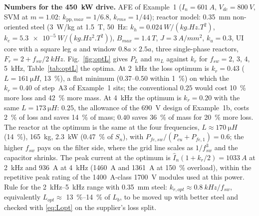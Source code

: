 \documentclass[10pt,a4paper]{scrartcl}
\newcommand{\Vdc}{V_{dc}}
\newcommand{\fsw}{f_{sw}}
\newcommand{\pp}{\mathrm{pp}}
\begin{document}
\begin{onehalfspace}
\textbf{Numbers for the \SI{450}{kW} drive.} AFE of Example~1 ($I_n = \SI{601}{A}$, $\Vdc = \SI{800}{V}$, SVM at $m = 1.02$: $k_{\pp,max} = 1/6.8$, $k_{rms} = 1/44$); reactor model: \SI{0.35}{mm} non-oriented steel (\SI{3}{W/kg} at \SI{1.5}{T}, \SI{50}{Hz}: $k_h = \SI{0.024}{W/(kg.Hz.T^2)}$, $k_e = \SI{5.3e-5}{W/(kg.Hz^2.T^2)}$), $B_{max} = \SI{1.4}{T}$, $J = \SI{3}{A/mm^2}$, $k_u = 0.3$, UI core with a square leg $a$ and window $0.8a \times 2.5a$, three single-phase reactors, $F_r = 2 + \fsw/\SI{2}{kHz}$. Fig.~\ref{fig:optL} gives $P_L$ and $m_L$ against $k_r$ for $\fsw = 2$, $3$, $4$, \SI{5}{kHz}, Table~\ref{tab:optL} the optima. At \SI{2}{kHz} the loss optimum is $k_r = 0.43$ ($L = \SI{161}{\micro H}$, \SI{13}{\percent}), a flat minimum ($0.37$--$0.50$ within \SI{1}{\percent}) on which the $k_r = 0.40$ of step~A3 of Example~1 sits; the conventional $0.25$ would cost \SI{10}{\percent} more loss and \SI{42}{\percent} more mass. At \SI{4}{kHz} the optimum is $k_r = 0.20$ with the same $L = \SI{173}{\micro H}$: $0.25$, the allowance of the \SI{690}{V} design of Example~1b, costs \SI{2}{\percent} of loss and saves \SI{14}{\percent} of mass; $0.40$ saves \SI{36}{\percent} of mass for \SI{20}{\percent} more loss. The reactor at the optimum is the same at the four frequencies, $L \approx \SI{170}{\micro H}$ (\SI{14}{\percent}), \SI{165}{kg}, \SI{2.3}{kW} (\SI{0.47}{\percent} of $S_n$), with $P_{fe,sw}/(P_{cu} + P_{fe,1}) = 0.6$; the higher $\fsw$ pays on the filter side, where the grid line scales as $1/\fsw^3$ and the capacitor shrinks. The peak current at the optimum is $\hat I_n(1 + k_r/2) = \SI{1033}{A}$ at \SI{2}{kHz} and \SI{936}{A} at \SI{4}{kHz} (\SI{1460}{A} and \SI{1361}{A} at \SI{150}{\percent} overload), within the repetitive peak rating of the \SI{1400}{A}-class \SI{1700}{V} modules used at this power. Rule for the \SIrange{2}{5}{kHz} range with \SI{0.35}{mm} steel: $k_{r,opt} \approx \SI{0.8}{kHz}/\fsw$, equivalently $L_{opt} \approx$ \SIrange{13}{14}{\percent} of $L_b$, to be moved up with better steel and checked with \eqref{eq:Lopt} on the supplier's loss split.


\end{onehalfspace}
\end{document}
